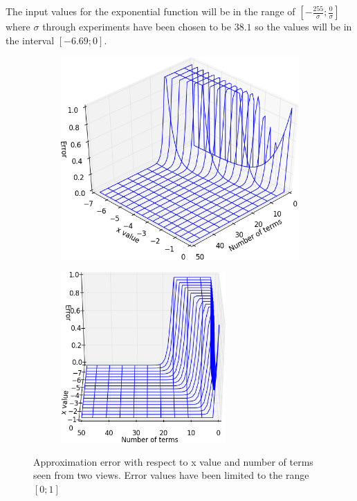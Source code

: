The input values for the exponential function will be in the range of $\left[ - \frac{255}{\sigma}; \frac{0}{\sigma} \right]$ where $\sigma$ through experiments have been chosen to be $38.1$ so the values will be in the interval $\left[ - 6.69; 0 \right]$. \\
\begin{figure}[ht!]
  \centering
  \begin{subfigure}[t]{0.50\textwidth}
    \centering\includegraphics[width=\textwidth]{figures/exp_err_surf.png}
  \end{subfigure}\hspace{0.5cm}
  \begin{subfigure}[t]{0.40\textwidth}
    \centering\includegraphics[height=6.5cm]{figures/exp_err_wire.png}
  \end{subfigure}
  \caption{Approximation error with respect to x value and number of terms seen from two views. Error values have been limited to the range $[0;1]$\label{fig:exp_err}}
\end{figure}

